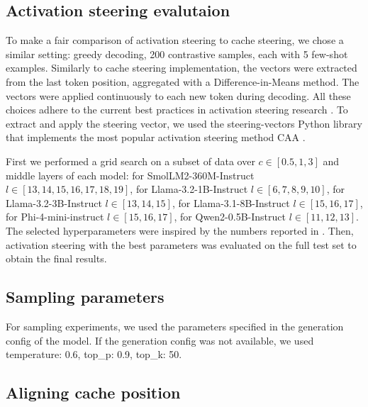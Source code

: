 \documentclass{article} %
\begin{document}
\subsection{Activation steering evalutaion} \label{act_steering_eval}

To make a fair comparison of activation steering to cache steering, we chose a similar setting: greedy decoding, 200 contrastive samples, each with 5 few-shot examples. Similarly to cache steering implementation, the vectors were extracted from the last token position, aggregated with a Difference-in-Means method. The vectors were applied continuously to each new token during decoding. All these choices adhere to the current best practices in activation steering research \citep{wehner2025taxonomy}.
To extract and apply the steering vector, we used the steering-vectors Python library \citep{steering-vectors} that implements the most popular activation steering method CAA \citep{panickssery2023steering}.

First we performed a grid search on a subset of data over \(c \in [0.5, 1, 3]\) and middle layers of each model: for SmolLM2-360M-Instruct \(l \in [13, 14, 15, 16, 17, 18, 19]\), for Llama-3.2-1B-Instruct \(l \in [6, 7, 8, 9, 10]\), for Llama-3.2-3B-Instruct \(l \in [13, 14, 15]\), for Llama-3.1-8B-Instruct \(l \in [15, 16, 17]\), for Phi-4-mini-instruct \(l \in [15, 16, 17]\), for Qwen2-0.5B-Instruct \(l \in [11, 12, 13]\). The selected hyperparameters were inspired by the numbers reported in \cite{turner2308activation}. Then, activation steering with the best parameters was evaluated on the full test set to obtain the final results.

\subsection{Sampling parameters} \label{sampling_parameters}
For sampling experiments, we used the parameters specified in the generation config of the model. If the generation config was not available, we used temperature: 0.6, top\_p: 0.9, top\_k: 50.

\subsection{Aligning cache position} \label{cache_position}
\end{document}

